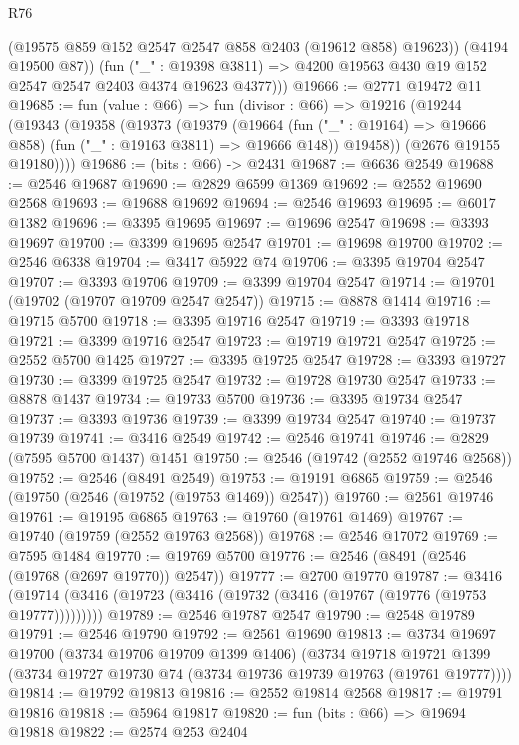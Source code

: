 \begin{lexlean}{R76}
\begin{coremodule}
            (@19575 @859 @152 @2547 @2547 @858 @2403 (@19612 @858) @19623))
          (@4194 @19500 @87))
        (fun ("_" : @19398 @3811) =>
        @4200 @19563 @430 @19 @152 @2547 @2547 @2403 @4374 @19623 @4377)))
@19666 := @2771 @19472 @11
@19685 := fun (value : @66) =>
  fun (divisor : @66) =>
  @19216
    (@19244
      (@19343
        (@19358
          (@19373
            (@19379
              (@19664 (fun ("_" : @19164) => @19666 @858) (fun ("_" : @19163 @3811) => @19666 @148))
              @19458))
          (@2676 @19155 @19180))))
@19686 := (bits : @66) -> @2431
@19687 := @6636 @2549
@19688 := @2546 @19687
@19690 := @2829 @6599 @1369
@19692 := @2552 @19690 @2568
@19693 := @19688 @19692
@19694 := @2546 @19693
@19695 := @6017 @1382
@19696 := @3395 @19695
@19697 := @19696 @2547
@19698 := @3393 @19697
@19700 := @3399 @19695 @2547
@19701 := @19698 @19700
@19702 := @2546 @6338
@19704 := @3417 @5922 @74
@19706 := @3395 @19704 @2547
@19707 := @3393 @19706
@19709 := @3399 @19704 @2547
@19714 := @19701 (@19702 (@19707 @19709 @2547 @2547))
@19715 := @8878 @1414
@19716 := @19715 @5700
@19718 := @3395 @19716 @2547
@19719 := @3393 @19718
@19721 := @3399 @19716 @2547
@19723 := @19719 @19721 @2547
@19725 := @2552 @5700 @1425
@19727 := @3395 @19725 @2547
@19728 := @3393 @19727
@19730 := @3399 @19725 @2547
@19732 := @19728 @19730 @2547
@19733 := @8878 @1437
@19734 := @19733 @5700
@19736 := @3395 @19734 @2547
@19737 := @3393 @19736
@19739 := @3399 @19734 @2547
@19740 := @19737 @19739
@19741 := @3416 @2549
@19742 := @2546 @19741
@19746 := @2829 (@7595 @5700 @1437) @1451
@19750 := @2546 (@19742 (@2552 @19746 @2568))
@19752 := @2546 (@8491 @2549)
@19753 := @19191 @6865
@19759 := @2546 (@19750 (@2546 (@19752 (@19753 @1469)) @2547))
@19760 := @2561 @19746
@19761 := @19195 @6865
@19763 := @19760 (@19761 @1469)
@19767 := @19740 (@19759 (@2552 @19763 @2568))
@19768 := @2546 @17072
@19769 := @7595 @1484
@19770 := @19769 @5700
@19776 := @2546 (@8491 (@2546 (@19768 (@2697 @19770)) @2547))
@19777 := @2700 @19770
@19787 := @3416 (@19714 (@3416 (@19723 (@3416 (@19732 (@3416 (@19767 (@19776 (@19753 @19777)))))))))
@19789 := @2546 @19787 @2547
@19790 := @2548 @19789
@19791 := @2546 @19790
@19792 := @2561 @19690
@19813 := @3734
    @19697
    @19700
    (@3734 @19706 @19709 @1399 @1406)
    (@3734
      @19718
      @19721
      @1399
      (@3734 @19727 @19730 @74 (@3734 @19736 @19739 @19763 (@19761 @19777))))
@19814 := @19792 @19813
@19816 := @2552 @19814 @2568
@19817 := @19791 @19816
@19818 := @5964 @19817
@19820 := fun (bits : @66) => @19694 @19818
@19822 := @2574 @253 @2404

\end{coremodule}
\end{lexlean}
